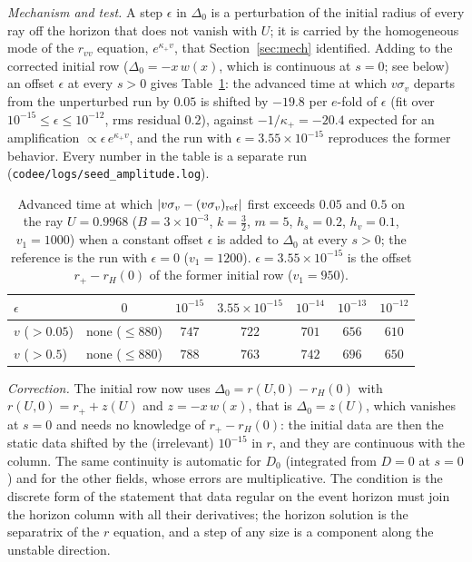 \documentclass[11pt]{article}
\begin{document}
\emph{Mechanism and test.} A step $\epsilon$ in $\Delta_0$ is a perturbation of the initial radius of every ray off the horizon that does not vanish with $U$; it is carried by the homogeneous mode of the $r_{vv}$ equation, $e^{\kappa_+v}$, that Section~\ref{sec:mech} identified. Adding to the corrected initial row ($\Delta_0=-x\,w(x)$, which is continuous at $s=0$; see below) an offset $\epsilon$ at every $s>0$ gives Table~\ref{tab:seed}: the advanced time at which $v\sigma_v$ departs from the unperturbed run by $0.05$ is shifted by $-19.8$ per $e$-fold of $\epsilon$ (fit over $10^{-15}\le\epsilon\le10^{-12}$, rms residual $0.2$), against $-1/\kappa_+=-20.4$ expected for an amplification $\propto\epsilon\,e^{\kappa_+v}$, and the run with $\epsilon=3.55\times10^{-15}$ reproduces the former behavior. Every number in the table is a separate run (\texttt{codee/logs/seed\_amplitude.log}).

\begin{table}[ht]\centering\small
\caption{Advanced time at which $|v\sigma_v-(v\sigma_v)_{\rm ref}|$ first exceeds $0.05$ and $0.5$ on the ray $U=0.9968$ ($B=3\times10^{-3}$, $k=\tfrac32$, $m=5$, $h_s=0.2$, $h_v=0.1$, $v_1=1000$) when a constant offset $\epsilon$ is added to $\Delta_0$ at every $s>0$; the reference is the run with $\epsilon=0$ ($v_1=1200$). $\epsilon=3.55\times10^{-15}$ is the offset $r_+-r_H(0)$ of the former initial row ($v_1=950$).}\label{tab:seed}
\begin{tabular}{lcccccc}
\toprule
$\epsilon$ & $0$ & $10^{-15}$ & $3.55\times10^{-15}$ & $10^{-14}$ & $10^{-13}$ & $10^{-12}$\\\midrule
$v$ ($>0.05$) & none ($\le880$) & $747$ & $722$ & $701$ & $656$ & $610$\\
$v$ ($>0.5$) & none ($\le880$) & $788$ & $763$ & $742$ & $696$ & $650$\\\bottomrule
\end{tabular}
\end{table}

\emph{Correction.} The initial row now uses $\Delta_0=r(U,0)-r_H(0)$ with $r(U,0)=r_++z(U)$ and $z=-x\,w(x)$, that is $\Delta_0=z(U)$, which vanishes at $s=0$ and needs no knowledge of $r_+-r_H(0)$: the initial data are then the static data shifted by the (irrelevant) $10^{-15}$ in $r$, and they are continuous with the column. The same continuity is automatic for $D_0$ (integrated from $D=0$ at $s=0$) and for the other fields, whose errors are multiplicative. The condition is the discrete form of the statement that data regular on the event horizon must join the horizon column with all their derivatives; the horizon solution is the separatrix of the $r$ equation, and a step of any size is a component along the unstable direction.
\end{document}
